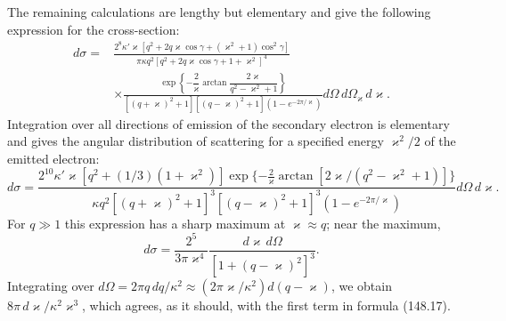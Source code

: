 The remaining calculations are lengthy but elementary and give the following
expression for the cross-section:
\[
\begin{split}
 d\sigma={}&\frac{2^8\kappa'\varkappa
 [q^2+2q\varkappa\cos\gamma+(\varkappa^2+1)\cos^2\gamma]}
 {\pi\kappa q^2[q^2+2q\varkappa\cos\gamma+1+\varkappa^2]^4}\\
 &\times\frac{\exp\!\left\{-\dfrac2\varkappa
 \arctan\dfrac{2\varkappa}{q^2-\varkappa^2+1}\right\}}
 {[(q+\varkappa)^2+1][(q-\varkappa)^2+1](1-e^{-2\pi/\varkappa})}
 d\Omega\,d\Omega_{\varkappa}\,d\varkappa.
\end{split}
\]
Integration over all directions of emission of the secondary electron is
elementary and gives the angular distribution of scattering for a specified
energy $\varkappa^2/2$ of the emitted electron:
\[
 d\sigma=\frac{2^{10}\kappa'\varkappa[q^2+(1/3)(1+\varkappa^2)]
 \exp\{-\frac2\varkappa\arctan[2\varkappa/(q^2-\varkappa^2+1)]\}}
 {\kappa q^2[(q+\varkappa)^2+1]^3[(q-\varkappa)^2+1]^3(1-e^{-2\pi/\varkappa})}
 d\Omega\,d\varkappa.
\]
For $q\gg1$ this expression has a sharp maximum at $\varkappa\approx q$;
near the maximum,
\[
 d\sigma=\frac{2^5}{3\pi\varkappa^4}
 \frac{d\varkappa\,d\Omega}{[1+(q-\varkappa)^2]^3}.
\]
Integrating over
$d\Omega=2\pi q\,dq/\kappa^2\approx(2\pi\varkappa/\kappa^2)d(q-\varkappa)$,
we obtain $8\pi\,d\varkappa/\kappa^2\varkappa^3$, which agrees, as it should,
with the first term in formula (148.17).

